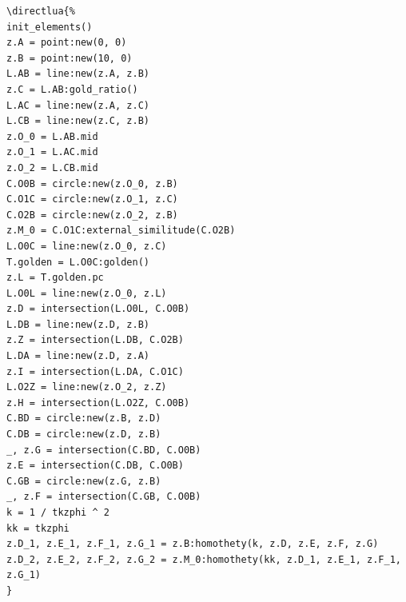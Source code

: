 \begin{minipage}{.5\textwidth}
\begin{Verbatim}
\directlua{%
init_elements()
z.A = point:new(0, 0)
z.B = point:new(10, 0)
L.AB = line:new(z.A, z.B)
z.C = L.AB:gold_ratio()
L.AC = line:new(z.A, z.C)
L.CB = line:new(z.C, z.B)
z.O_0 = L.AB.mid
z.O_1 = L.AC.mid
z.O_2 = L.CB.mid
C.O0B = circle:new(z.O_0, z.B)
C.O1C = circle:new(z.O_1, z.C)
C.O2B = circle:new(z.O_2, z.B)
z.M_0 = C.O1C:external_similitude(C.O2B)
L.O0C = line:new(z.O_0, z.C)
T.golden = L.O0C:golden()
z.L = T.golden.pc
L.O0L = line:new(z.O_0, z.L)
z.D = intersection(L.O0L, C.O0B)
L.DB = line:new(z.D, z.B)
z.Z = intersection(L.DB, C.O2B)
L.DA = line:new(z.D, z.A)
z.I = intersection(L.DA, C.O1C)
L.O2Z = line:new(z.O_2, z.Z)
z.H = intersection(L.O2Z, C.O0B)
C.BD = circle:new(z.B, z.D)
C.DB = circle:new(z.D, z.B)
_, z.G = intersection(C.BD, C.O0B)
z.E = intersection(C.DB, C.O0B)
C.GB = circle:new(z.G, z.B)
_, z.F = intersection(C.GB, C.O0B)
k = 1 / tkzphi ^ 2
kk = tkzphi
z.D_1, z.E_1, z.F_1, z.G_1 = z.B:homothety(k, z.D, z.E, z.F, z.G)
z.D_2, z.E_2, z.F_2, z.G_2 = z.M_0:homothety(kk, z.D_1, z.E_1, z.F_1, z.G_1)
}
\end{Verbatim}
\end{minipage}
\begin{minipage}{.5\textwidth}
  \hfill
{}
\end{minipage}

